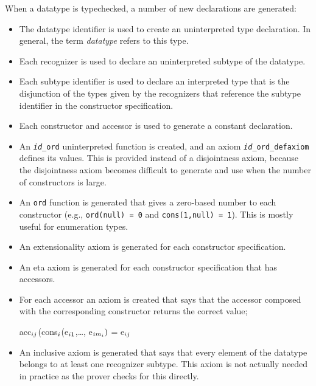 When a datatype is typechecked, a number of new declarations are
generated:
\begin{itemize}

\item The datatype identifier is used to create an uninterpreted type
declaration.  In general, the term \emph{datatype} refers to this type.

\item Each recognizer is used to declare an uninterpreted subtype of the
datatype.

\item Each subtype identifier is used to declare an interpreted type that
is the disjunction of the types given by the recognizers that reference
the subtype identifier in the constructor specification.

\item Each constructor and accessor is used to generate a constant
declaration.

\item An \texttt{\emph{id}\_ord} uninterpreted function is created, and an
axiom \texttt{\emph{id}\_ord\_defaxiom} defines its values.  This is
provided instead of a disjointness axiom, because the disjointness axiom
becomes difficult to generate and use when the number of constructors is
large.

\item An \texttt{ord} function is generated that gives a zero-based number
to each constructor (e.g., \texttt{ord(null) = 0} and \texttt{cons(1,null)
= 1}).  This is mostly useful for enumeration types.

\item An extensionality axiom is generated for each constructor
specification.

\item An eta axiom is generated for each constructor specification
that has accessors.

\item For each accessor an axiom is created that says that the accessor
composed with the corresponding constructor returns the correct value; \eg\
\begin{pvsex}
  acc\(\sb{ij}\)(cons\(\sb{i}\)(e\(\sb{i1}\),\ldots, e\(\sb{i{m\sb{i}}})\) = e\(\sb{ij}\)
\end{pvsex}

\item An inclusive axiom is generated that says that every element of
the datatype belongs to at least one recognizer subtype.  This axiom is
not actually needed in practice as the prover checks for this directly.


\end{itemize}
